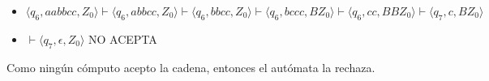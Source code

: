 \documentclass{article}
\begin{document}
\begin{enumerate}
{\begin{enumerate}
{\begin{itemize}
{        		\begin{itemize}
        		\item {
        			$\langle q_6, aabbcc, Z_0 \rangle \vdash \langle q_6, abbcc, Z_0 \rangle \vdash \langle q_6, bbcc, Z_0 \rangle \vdash  \langle q_6, bccc, BZ_0 \rangle \vdash  \langle q_6, cc, BBZ_0 \rangle \vdash \langle q_7, c, BZ_0 \rangle$ 
        		}
        		\item {
        			$\vdash \langle q_7, \epsilon, Z_0 \rangle$ NO ACEPTA\\
        		}
        		\end{itemize}
        		Como ningún cómputo acepto la cadena, entonces el autómata la rechaza.\\
        		
        		}
        	\end{itemize}
        		
        	}
        
        \end{enumerate}
    	}
    \end{enumerate}
\end{document}
